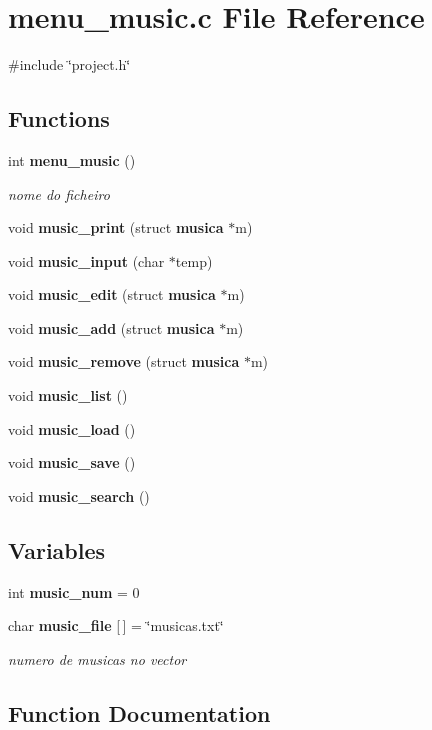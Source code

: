 \section{menu\+\_\+music.\+c File Reference}
\label{menu__music_8c}
{\ttfamily \#include \char`\"{}project.\+h\char`\"{}}\newline
\subsection*{Functions}
\begin{DoxyCompactItemize}
\item 
int \textbf{ menu\+\_\+music} ()
\begin{DoxyCompactList}\small\item\em nome do ficheiro \end{DoxyCompactList}\item 
void \textbf{ music\+\_\+print} (struct \textbf{ musica} $\ast$m)
\item 
void \textbf{ music\+\_\+input} (char $\ast$temp)
\item 
void \textbf{ music\+\_\+edit} (struct \textbf{ musica} $\ast$m)
\item 
void \textbf{ music\+\_\+add} (struct \textbf{ musica} $\ast$m)
\item 
void \textbf{ music\+\_\+remove} (struct \textbf{ musica} $\ast$m)
\item 
void \textbf{ music\+\_\+list} ()
\item 
void \textbf{ music\+\_\+load} ()
\item 
void \textbf{ music\+\_\+save} ()
\item 
void \textbf{ music\+\_\+search} ()
\end{DoxyCompactItemize}
\subsection*{Variables}
\begin{DoxyCompactItemize}
\item 
int \textbf{ music\+\_\+num} = 0
\item 
char \textbf{ music\+\_\+file} [$\,$] = \char`\"{}musicas.\+txt\char`\"{}
\begin{DoxyCompactList}\small\item\em numero de musicas no vector \end{DoxyCompactList}\end{DoxyCompactItemize}


\subsection{Function Documentation}
\mbox{\label{menu__music_8c_a088df08a705b7c74bda39434bbefa5c8}} 

